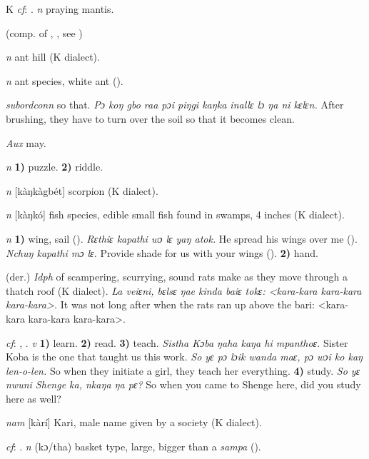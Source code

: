 \begin{letter}{K}
 \textit{cf}: . \textit{n} praying mantis.

 (comp. of , , see ) 

 \textit{n} ant hill (K dialect). 

 \textit{n} ant species, white ant (\citealt{Pichl1967}). 

 \textit{subordconn} so that. \textit{Pɔ koŋ gbo raa pɔi piŋgi kaŋka inallɛ lɔ ŋa ni kɛlɛn.} After brushing, they have to turn over the soil so that it becomes clean.

 \textit{Aux} may.

 \textit{n} \textbf{1)} puzzle. \textbf{2)} riddle.

 \textit{n} [kàŋkàgbét] scorpion (K dialect). 

 \textit{n} [kàŋkó] fish species, edible small fish found in swamps, 4 inches (K dialect). 

 \textit{n} \textbf{1)} wing, sail (\citealt{Pichl1967}). \textit{Rɛthiɛ kapathi wɔ lɛ yaŋ atok.} He spread his wings over me (\citealt{Pichl1967}). \textit{Nchuŋ kapathi mɔ lɛ.} Provide shade for us with your wings (\citealt{Pichl1967}). \textbf{2)} hand.

 (der.) \textit{Idph} of scampering, scurrying, sound rats make as they move through a thatch roof (K dialect). \textit{La veiɛni, bɛlsɛ ŋae kinda baiɛ tokɛ: <kara-kara kara-kara kara-kara>.} It was not long after when the rats ran up above the bari: <kara-kara kara-kara kara-kara>. 

 \textit{cf}: , . \textit{v} \textbf{1)} learn. \textbf{2)} read. \textbf{3)} teach. \textit{Sistha Kɔba ŋaha kaŋa hi mpanthoɛ.} Sister Koba is the one that taught us this work. \textit{So yɛ pɔ lɔik wanda maɛ, pɔ wɔi ko kaŋ len-o-len.} So when they initiate a girl, they teach her everything. \textbf{4)} study. \textit{So yɛ nwuni Shenge ka, nkaŋa ŋa pɛ?} So when you came to Shenge here, did you study here as well?

 \textit{nam} [kàrí] Kari, male name given by a society (K dialect). 

 \textit{cf}: . \textit{n} (kɔ/tha) basket type, large, bigger than a \textit{sampa} (\citealt{Pichl1967}). 


\end{letter}

